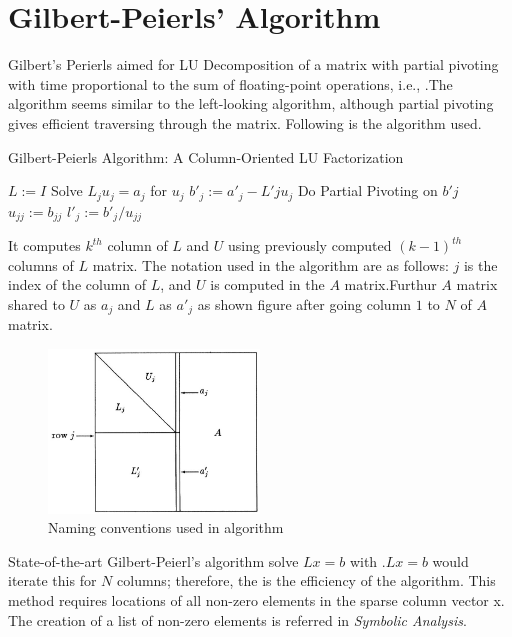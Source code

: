 \section{Gilbert-Peierls' Algorithm}
Gilbert's Perierls \cite{GPAlgo} aimed for LU Decomposition of a matrix with partial pivoting with time proportional to the sum of floating-point operations, i.e., .The algorithm seems similar to the left-looking algorithm, although partial pivoting gives efficient traversing through the matrix. Following is the algorithm used.

\begin{algorithm}
    \caption{Gilbert-Peierls Algorithm: A Column-Oriented LU Factorization
        \label{algo:GP}}
    \begin{algorithmic}[1]
        \Statex
        \State $L := I$
            \State Solve $L_j u_j = a_j$ for $u_j$
            \State $b'_j := a'_j - L'j u_j$
            \State Do Partial Pivoting on $b'j$
            \State $u_{jj} := b_{jj}$
            \State $l'_j := b'_j / u_{jj}$
        \EndFor
    \end{algorithmic}
\end{algorithm}

It computes $k^{th}$ column of $L$ and $U$ using previously computed $(k-1)^{th}$ columns of $L$ matrix. The notation used in the algorithm are as follows:
$j$ is the index of the column of $L$, and $U$ is computed in the $A$ matrix.Furthur $A$ matrix shared to $U$ as $a_j$ and $L$ as $a'_j$ as shown figure after going column $1$ to $N$ of $A$ matrix.

\begin{figure}[H]
    \centering
    \includegraphics[width = 0.50\textwidth]{./Theory/gpConvention.JPG}
    \caption{Naming conventions used in algorithm}
    \label{fig:GP:namingConvention}
\end{figure}

State-of-the-art Gilbert-Peierl's algorithm \cite{GPAlgo} solve $Lx=b$ with .$Lx=b$ would iterate this for $N$ columns; therefore, the   is the efficiency of the algorithm.
This method requires locations of all non-zero elements in the sparse column vector x. The creation of a list of non-zero elements is referred in \textit{Symbolic Analysis}.

